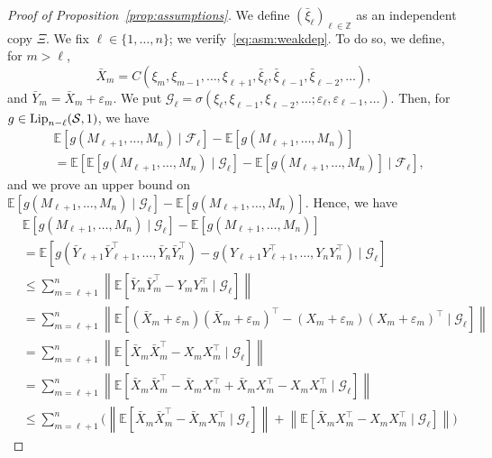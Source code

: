 \documentclass[11pt,a4paper]{article}
\theoremstyle{remark}
\theoremstyle{definition}
\theoremstyle{definition}
\begin{document}
\begin{bibunit}[apalike]
\begin{proof}[Proof of Proposition~\ref{prop:assumptions}]
We define $(\bar{\xi}_\ell)_{\ell\in\mathbb{Z}}$ as an independent copy $\Xi$. 
We fix $\ell\in\{1,\dots,n\}$; we verify~\eqref{eq:asm:weakdep}. To do so, we define, for $m>\ell$,
$$ \bar{X}_m = C(\xi_m,\xi_{m-1},\dots,\xi_{\ell+1},\bar{\xi}_{\ell},\bar{\xi}_{\ell-1},\bar{\xi}_{\ell-2},\dots), $$
and $\bar{Y}_m = \bar{X}_m + \varepsilon_m $.
We put $\mathcal{G}_{\ell} = \sigma(\xi_{\ell},\xi_{\ell-1},\xi_{\ell-2},\dots; \varepsilon_\ell,\varepsilon_{\ell-1},\dots) $. Then, for $g\in{\rm Lip}_{n-\ell}(\mathcal{S},1)$, we have
\begin{align*}
 & \mathbb{E}[g(M_{\ell+1},\dots,M_n)\mid \mathcal{F}_\ell] - \mathbb{E}[g(M_{\ell+1},\dots,M_n)] 
 \\
 & = \mathbb{E}[\mathbb{E}[g(M_{\ell+1},\dots,M_n)\mid \mathcal{G}_\ell] - \mathbb{E}[g(M_{\ell+1},\dots,M_n)] \mid \mathcal{F}_\ell],
\end{align*}
and we prove an upper bound on $\mathbb{E}[g(M_{\ell+1},\dots,M_n) \mid \mathcal{G}_\ell] - \mathbb{E}[g(M_{\ell+1},\dots,M_n)]$. 
Hence, we have
\begin{align*}
 & \mathbb{E}[g(M_{\ell+1},\dots,M_n)\mid \mathcal{G}_\ell] - \mathbb{E}[g(M_{\ell+1},\dots,M_n)]
 \\
 & = \mathbb{E}[g(\bar{Y}_{\ell+1} \bar{Y}_{\ell+1}^\top ,\dots,\bar{Y}_n \bar{Y}_{n}^\top) - g(Y_{\ell+1} Y_{\ell+1}^\top ,\dots,Y_n Y_{n}^\top)\mid \mathcal{G}_\ell]
 \\
 & \leq \sum_{m=\ell+1}^n \left\| \mathbb{E}\left[ \bar{Y}_m \bar{Y}_{m}^\top - Y_m Y_{m}^\top   \mid \mathcal{G}_{\ell}\right]   \right\|
 \\
 & = \sum_{m=\ell+1}^n \left\| \mathbb{E}\left[ (\bar{X}_m + \varepsilon_m) (\bar{X}_{m} + \varepsilon_{m})^\top - (X_m + \varepsilon_m) ( X_{m} + \varepsilon_{m})^\top  \mid \mathcal{G}_{\ell}\right]   \right\|
 \\
 & =  \sum_{m=\ell+1}^n \left\| \mathbb{E}\left[ \bar{X}_m \bar{X}_{m}^\top - X_m X_{m}^\top  \mid \mathcal{G}_{\ell}\right]   \right\|
 \\
 & = \sum_{m=\ell+1}^n \left\| \mathbb{E}\left[ \bar{X}_m \bar{X}_{m}^\top -  \bar{X}_m X_{m}^\top   + \bar{X}_m X_{m}^\top   - X_m X_{m}^\top  \mid \mathcal{G}_{\ell}\right]   \right\|
 \\
 & \leq \sum_{m=\ell+1}^n  \biggl( \left\| \mathbb{E}\left[ \bar{X}_m \bar{X}_{m}^\top -  \bar{X}_m X_{m}^\top  \mid \mathcal{G}_{\ell}\right]   \right\| + \left\| \mathbb{E}\left[  \bar{X}_m X_{m}^\top   - X_m X_{m}^\top  \mid \mathcal{G}_{\ell}\right]   \right\| \biggr)

\end{align*}
\end{proof}
\end{bibunit}
\end{document}
